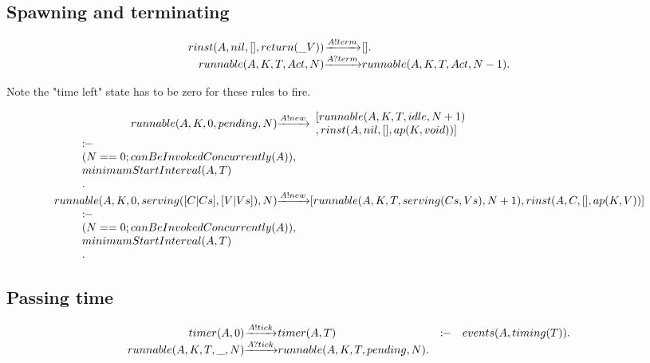 \subsection{Spawning and terminating}

\[
\begin{array}{r@{}c@{}l}
  \Preduce{rinst(A, nil, [], return(\_V))}{\Psay{A}{term}}{[]}    .
\\\Preduce{runnable(A, K, T, Act, N)}{\Phear{A}{term}}{runnable(A, K, T, Act, N-1)}.
\end{array}
\]

Note the "time left" state has to be zero for these rules to fire.

\[
\begin{array}{r@{}c@{}l}
  \Preduce{runnable(A, K, 0, pending, N)}{\Psay{A}{new}}{\begin{array}{l}
                                                        [ runnable(A, K, T, idle, N+1)
                                                      \\, rinst(A, nil, [], ap(K,void)) ]
                                                     \end{array}}
  \Pcontline{\begin{array}{l}
               \Pif
             \\(N == 0 ; canBeInvokedConcurrently(A)),
             \\minimumStartInterval(A, T)
             \\.
             \end{array}}
\\\Preduce{runnable(A, K, 0, serving([C|Cs],[V|Vs]), N)}{\Psay{A}{new}}{[ runnable(A, K, T, serving(Cs,Vs), N+1)
                                                                   , rinst(A, C, [], ap(K,V)) ]}
  \Pcontline{\begin{array}{l}
               \Pif
             \\(N == 0 ; canBeInvokedConcurrently(A)),
             \\minimumStartInterval(A, T)
             \\.
             \end{array}}
\end{array}
\]

\subsection{Passing time}


\[
\begin{array}{r@{}c@{}lcl}
  \Preduce{timer(A, 0)             }{\Psay{A}{tick}} {timer(A, T)}                   & \Pif&    events(A, timing(T))    .
\\\Preduce{runnable(A, K, T, \_, N)}{\Phear{A}{tick}}{runnable(A, K, T, pending, N)} .
\end{array}
\]


